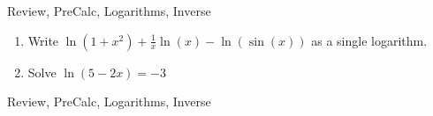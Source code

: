 \begin{tagblock}{Review, PreCalc, Logarithms, Inverse}
\begin{question}
\begin{enumerate}
\item Write $\ln(1+x^2) + \frac{1}{x} \ln(x) - \ln(\sin(x))$ as a single logarithm.  

\vspace{1in}
\item Solve $\ln(5-2x) = -3$

\end{enumerate}




	
 

\begin{tags}
	    Review, PreCalc, Logarithms, Inverse
\end{tags}
	
\begin{diary}
	    
\end{diary}
	
\begin{solution}
		
\end{solution}
	
\end{question}

\end{tagblock}



